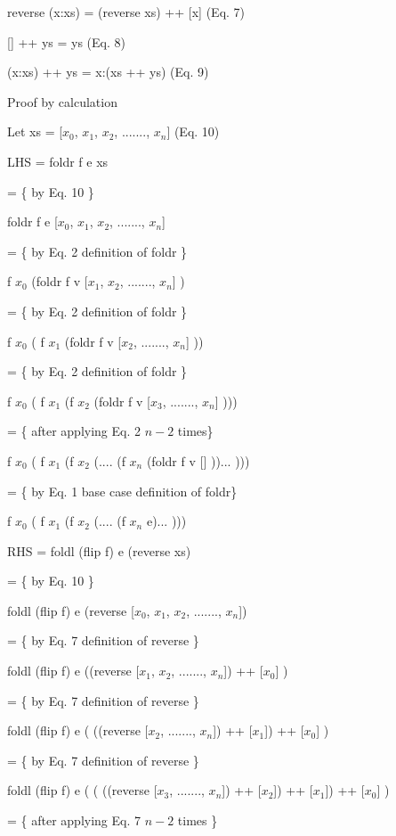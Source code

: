 \documentclass[12pt]{article}
\begin{document}
reverse (x:xs) = (reverse xs) ++ [x]	 (Eq. 7)

[] ++ ys = ys						(Eq. 8)

(x:xs) ++ ys = x:(xs ++ ys)			(Eq. 9)

Proof by calculation


Let xs = [$x_{0}$, $x_{1}$, $x_{2}$, ......., $x_{n}$]       (Eq. 10)

LHS = foldr f e xs

	= \{ by Eq. 10 \}

	foldr f e [$x_{0}$, $x_{1}$, $x_{2}$, ......., $x_{n}$] 	
	
	= \{ by Eq. 2 definition of foldr \}
	
	f $x_{0}$ (foldr f v [$x_{1}$, $x_{2}$, ......., $x_{n}$] ) 
	
	= \{ by Eq. 2 definition of foldr \}
	
	f $x_{0}$ ( f $x_{1}$ (foldr f v [$x_{2}$,  ......., $x_{n}$] )) 

	= \{ by Eq. 2 definition of foldr \}
	
	f $x_{0}$ ( f $x_{1}$ (f $x_{2}$ (foldr f v [$x_{3}$,  ......., $x_{n}$] ))) 
	
	= \{ after applying Eq. 2 $n - 2$ times\}
	
	f $x_{0}$ ( f $x_{1}$ (f $x_{2}$ (.... (f $x_{n}$ (foldr f v [] ))... ))) 

	= \{ by Eq. 1 base case definition of foldr\}
	
	f $x_{0}$ ( f $x_{1}$ (f $x_{2}$ (.... (f $x_{n}$ e)... ))) 
	
	
	

RHS = foldl (flip f) e (reverse xs)

	 = \{ by Eq. 10 \}
	 
	 foldl (flip f) e (reverse [$x_{0}$, $x_{1}$, $x_{2}$, ......., $x_{n}$])	

	 = \{ by Eq. 7 definition of reverse \}
	 
	 foldl (flip f) e ((reverse [$x_{1}$, $x_{2}$, ......., $x_{n}$]) ++ [$x_{0}$] )
	 
	 = \{ by Eq. 7 definition of reverse \}
	 
	 foldl (flip f) e ( ((reverse [$x_{2}$, ......., $x_{n}$]) ++ [$x_{1}$]) ++ [$x_{0}$] )
	 
	 = \{ by Eq. 7 definition of reverse \}
	 
	 foldl (flip f) e ( ( ((reverse [$x_{3}$, ......., $x_{n}$]) ++ [$x_{2}$]) ++ [$x_{1}$]) ++ [$x_{0}$] )
	
	 = \{ after applying Eq. 7 $n - 2$ times \}
	 
\end{document}

